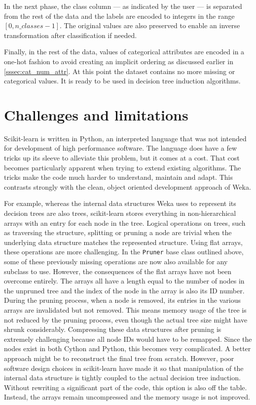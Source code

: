 In the next phase, the class column --- as indicated by the user --- is separated from the rest of the data and the labels are encoded to integers in the range $[0, n\_classes - 1]$. The original values are also preserved to enable an inverse transformation after classification if needed. 

Finally, in the rest of the data, values of categorical attributes are encoded in a one-hot fashion to avoid creating an implicit ordering as discussed earlier in \autoref{sssec:cat_num_attr}. At this point the dataset contains no more missing or categorical values. It is ready to be used in decision tree induction algorithms.


\section{Challenges and limitations}
Scikit-learn is written in Python, an interpreted language that was not intended for development of high performance software. The language does have a few tricks up its sleeve to alleviate this problem, but it comes at a cost. That cost becomes particularly apparent when trying to extend existing algorithms. The tricks make the code much harder to understand, maintain and adapt. This contrasts strongly with the clean, object oriented development approach of Weka.

For example, whereas the internal data structures Weka uses to represent its decision trees are also trees, scikit-learn stores everything in non-hierarchical arrays with an entry for each node in the tree. Logical operations on trees, such as traversing the structure, splitting or pruning a node are trivial when the underlying data structure matches the represented structure. Using flat arrays, these operations are more challenging. In the \texttt{Pruner} base class outlined above, some of these previously missing operations are now also available for any subclass to use. However, the consequences of the flat arrays have not been overcome entirely. The arrays all have a length equal to the number of nodes in the unpruned tree and the index of the node in the array is also its ID number. During the pruning process, when a node is removed, its entries in the various arrays are invalidated but not removed. This means memory usage of the tree is not reduced by the pruning process, even though the actual tree size might have shrunk considerably. Compressing these data structures after pruning is extremely challenging because all node IDs would have to be remapped. Since the nodes exist in both Cython and Python, this becomes very complicated. A better approach might be to reconstruct the final tree from scratch. However, poor software design choices in scikit-learn have made it so that manipulation of the internal data structure is tightly coupled to the actual decision tree induction. Without rewriting a significant part of the code, this option is also off the table. Instead, the arrays remain uncompressed and the memory usage is not improved.

